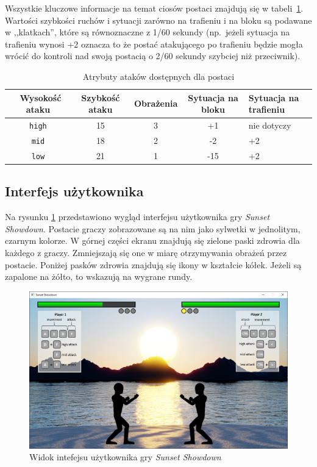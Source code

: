Wszystkie kluczowe informacje na temat ciosów postaci znajdują się w tabeli~\ref{tab:ataki}. Wartości szybkości ruchów i sytuacji zarówno na trafieniu i na bloku są podawane w ,,klatkach'', które są równoznaczne z 1/60 sekundy (np.\ jeżeli sytuacja na trafieniu wynosi +2 oznacza to że postać atakującego po trafieniu będzie mogła wrócić do kontroli nad swoją postacią o 2/60 sekundy szybciej niż przeciwnik).

\begin{table}[htb] \small
\centering
\caption{Atrybuty ataków dostępnych dla postaci}
\label{tab:ataki}
\begin{tabularx}{\linewidth}{|c|c|c|c|>{\centering\arraybackslash}X|} \hline\
Wysokość ataku & Szybkość ataku & Obrażenia & Sytuacja na bloku & Sytuacja na trafieniu \\ \hline\hline
\texttt{high} & 15 & 3 & +1 & nie dotyczy \\ \hline
\texttt{mid} & 18 & 2 & -2 & +2\\ \hline
\texttt{low} & 21 & 1 & -15 & +2\\ \hline
\end{tabularx}
\end{table}

\subsection{Interfejs użytkownika}
Na rysunku \ref{fig:interfejs} przedstawiono wygląd interfejsu użytkownika gry \emph{Sunset Showdown}. Postacie graczy zobrazowane są na nim jako sylwetki w jednolitym, czarnym kolorze. W górnej części ekranu znajdują się zielone paski zdrowia dla każdego z graczy. Zmniejszają się one w miarę otrzymywania obrażeń przez postacie. Poniżej pasków zdrowia znajdują się ikony w kształcie kółek. Jeżeli są zapalone na żółto, to wskazują na wygrane rundy.
\begin{figure}[htb]
	\centering
		\includegraphics[width=0.64\linewidth]{rys02/interfejs}
	\caption{Widok intefejsu użytkownika gry \emph{Sunset Showdown}}
	\label{fig:interfejs}
\end{figure}

